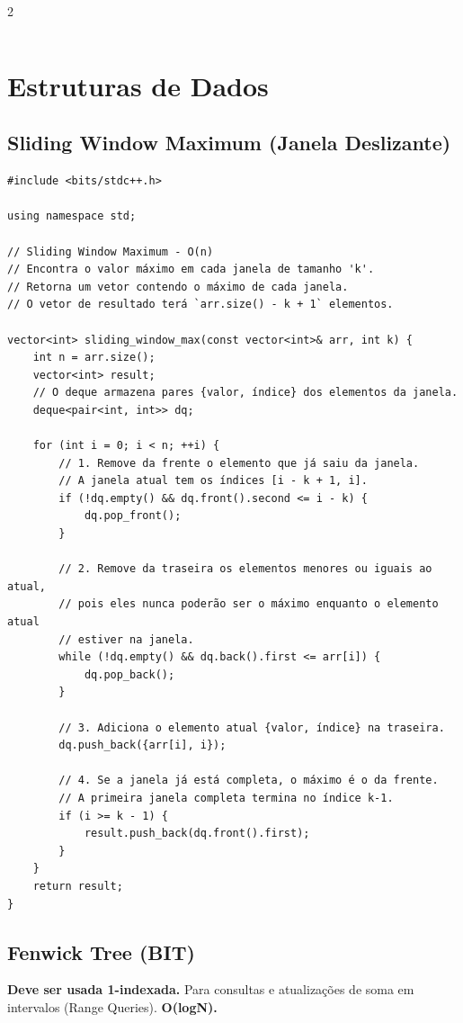 \documentclass[11pt]{article}
\begin{document}
\begin{multicols}{2}
\begin{lstlisting}
\end{lstlisting}

\section{Estruturas de Dados}

\subsection{Sliding Window Maximum (Janela Deslizante)}
\begin{lstlisting}
#include <bits/stdc++.h>

using namespace std;

// Sliding Window Maximum - O(n)
// Encontra o valor máximo em cada janela de tamanho 'k'.
// Retorna um vetor contendo o máximo de cada janela.
// O vetor de resultado terá `arr.size() - k + 1` elementos.

vector<int> sliding_window_max(const vector<int>& arr, int k) {
    int n = arr.size();
    vector<int> result;
    // O deque armazena pares {valor, índice} dos elementos da janela.
    deque<pair<int, int>> dq;

    for (int i = 0; i < n; ++i) {
        // 1. Remove da frente o elemento que já saiu da janela.
        // A janela atual tem os índices [i - k + 1, i].
        if (!dq.empty() && dq.front().second <= i - k) {
            dq.pop_front();
        }

        // 2. Remove da traseira os elementos menores ou iguais ao atual,
        // pois eles nunca poderão ser o máximo enquanto o elemento atual
        // estiver na janela.
        while (!dq.empty() && dq.back().first <= arr[i]) {
            dq.pop_back();
        }

        // 3. Adiciona o elemento atual {valor, índice} na traseira.
        dq.push_back({arr[i], i});

        // 4. Se a janela já está completa, o máximo é o da frente.
        // A primeira janela completa termina no índice k-1.
        if (i >= k - 1) {
            result.push_back(dq.front().first);
        }
    }
    return result;
}
\end{lstlisting}

\subsection{Fenwick Tree (BIT)}
\textbf{Deve ser usada 1-indexada.} Para consultas e atualizações de soma em intervalos (Range Queries). \textbf{O(logN).}
\begin{lstlisting}


\end{lstlisting}
\end{multicols}
\end{document}
